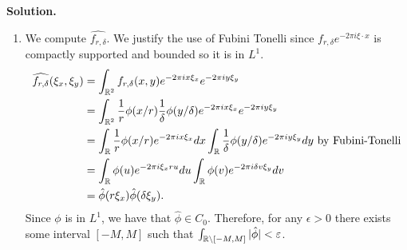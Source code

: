 \documentclass[11pt]{article}
\begin{document}
\begin{enumerate}[leftmargin=2em, label=\arabic*.]
    \textbf{Solution.}
    \begin{enumerate}
        \item We compute $\widehat{f_{r, \delta}}$.
            We justify the use of Fubini Tonelli since $f_{r, \delta}e^{-2\pi i \xi \cdot x}$ is compactly supported and bounded so it is in $L^{1}$.
            \begin{align*}
                \widehat{f_{r, \delta}}(\xi_{x}, \xi_y) &=  \int_{\mathbb{R}^{2}} f_{r, \delta}(x, y) e^{-2\pi i x \xi_{x}}  e^{-2\pi i y \xi_{y}} \\
                &=  \int_{\mathbb{R}^2} \frac{1}{r} \phi(x / r) \frac{1}{\delta} \phi(y / \delta) e^{-2\pi i x \xi_{x}}  e^{-2\pi i y \xi_{y}} \\
                &= \int_{\mathbb{R}} \frac{1}{r} \phi(x / r) e^{-2\pi i x \xi_{x}} dx\int_{\mathbb{R}} \frac{1}{\delta} \phi(y / \delta) e^{-2\pi i y \xi_{y}} dy \text{ by Fubini-Tonelli}\\
                &=  \int_{\mathbb{R}} \phi(u) e^{-2 \pi i \xi_{x} r u } du \int_{\mathbb{R}} \phi(v) e^{- 2 \pi i \delta v \xi_y} dv \\
                &= \hat{\phi}(r \xi_x) \hat{\phi}(\delta \xi_y) 
            .\end{align*}
            Since $\phi$ is in $L^{1}$, we have that $\hat{\phi} \in C_{0}$.
            Therefore, for any $\epsilon > 0$ there exists some interval $[-M, M]$ such that $\int_{\mathbb{R} \setminus [-M, M]} |\hat{\phi}| < \varepsilon$.


\end{enumerate}
\end{enumerate}
\end{document}
